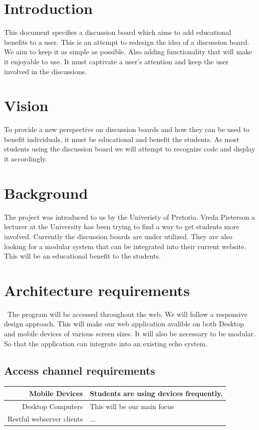 \documentclass[a4paper,12pt]{report}
\begin{document}
\section{Introduction}
This document specifies a discussion board which aims to add educational benefits to a user. This is an attempt to redesign the idea of a discussion board. We aim to keep it as simple as possible. Also adding functionality that will make it enjoyable to use. It must captivate a user's attention and keep the user involved in the discussions. 
\section{Vision}
To provide a new perspective on discussion boards and how they can be used to benefit individuals, it must be educational and benefit the students. As most students using the discussion board we will attempt to recognize code and display it accordingly.
\section{Background}
The project was introduced to us by the Univeristy of Pretoria. Vreda Pieterson a lecturer at the University has been trying to find a way to get students more involved. Currently the discussion boards are under utilized. They are also looking for a modular system that can be integrated into their current website. This will be an educational benefit to the students.
\section{Architecture requirements}\
The program will be accessed throughout the web. We will follow a responsive design approach. This will make our web application avalible on both Desktop and mobile devices of various screen sizes. It will also be necessary to be modular. So that the application can integrate into an existing echo system.
\subsection{Access channel requirements}

\begin{tabular}{|r|l|}
\hline
Mobile Devices & Students are using devices frequently. \\
\hline
Desktop Computers &  This will be our main focus\\
\hline
Restful webserver clients & ... \\
\hline
\end{tabular}
\end{document}
